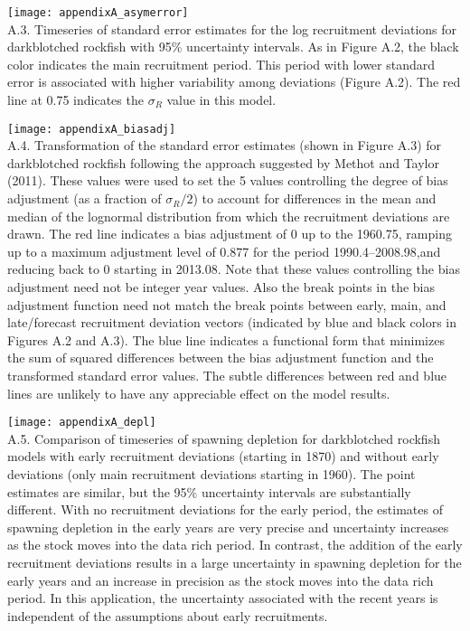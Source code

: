 \texttt{[image: appendixA\_asymerror]}\\
\figurename{ A.3. Timeseries of standard error estimates for the log recruitment deviations for darkblotched rockfish with 95\% uncertainty intervals. As in Figure A.2, the black color indicates the main recruitment period. This period with lower standard error is associated with higher variability among deviations (Figure A.2). The red line at 0.75 indicates the  $\sigma_R$ value in this model.}

\texttt{[image: appendixA\_biasadj]}\\
\figurename{ A.4. Transformation of the standard error estimates (shown in Figure A.3) for darkblotched rockfish following the approach suggested by Methot and Taylor (2011). These values were used to set the 5 values controlling the degree of bias adjustment (as a fraction of  $\sigma_R/2$) to account for differences in the mean and median of the lognormal distribution from which the recruitment deviations are drawn. The red line indicates a bias adjustment of 0 up to the  1960.75, ramping up to a maximum adjustment level of 0.877 for the period 1990.4–2008.98,and reducing back to 0 starting in 2013.08. Note that these values controlling the bias adjustment need not be integer year values. Also the break points in the bias adjustment function need not match the break points between early, main, and late/forecast recruitment deviation vectors (indicated by blue and black colors in Figures A.2 and A.3). The blue line indicates a functional form that minimizes the sum of squared differences between the bias adjustment function and the transformed standard error values. The subtle differences between red and blue lines are unlikely to have any appreciable effect on the model results.}

\texttt{[image: appendixA\_depl]}\\
\figurename{ A.5. Comparison of timeseries of spawning depletion for darkblotched rockfish models with early recruitment deviations (starting in 1870) and without early deviations (only main recruitment deviations starting in 1960). The point estimates are similar, but the 95\% uncertainty intervals are substantially different. With no recruitment deviations for the early period, the estimates of spawning depletion in the early years are very precise and uncertainty increases as the stock moves into the data rich period. In contrast, the addition of the early recruitment deviations results in a large uncertainty in spawning depletion for the early years and an increase in precision as the stock moves into the data rich period. In this application, the uncertainty associated with the recent years is independent of the assumptions about early recruitments.}


